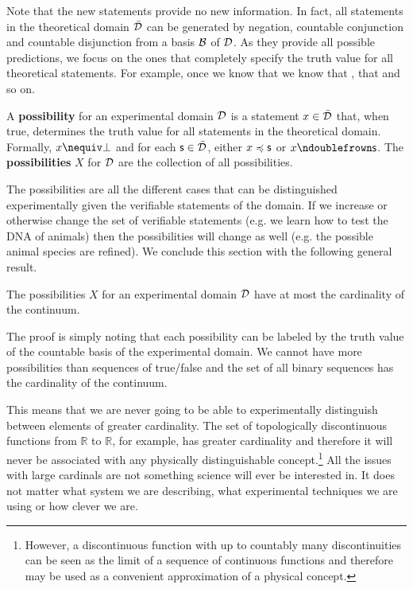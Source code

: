 \documentclass[letterpaper]{article}
\begin{document}
Note that the new statements provide no new information. In fact, all statements in the theoretical domain $\bar{\mathcal{D}}$ can be generated by negation, countable conjunction and countable disjunction from a basis $\mathcal{B}$ of $\mathcal{D}$. As they provide all possible predictions, we focus on the ones that completely specify the truth value for all theoretical statements. For example, once we know that  we know that , that  and so on.

\begin{defn}
	A \textbf{possibility} for an experimental domain $\mathcal{D}$ is a statement $x \in \bar{\mathcal{D}}$ that, when true, determines the truth value for all statements in the theoretical domain. Formally, $x \nequiv \contradiction$ and for each $\mathsf{s} \in \bar{\mathcal{D}}$, either $x \preccurlyeq \mathsf{s}$ or $x \ncomp \mathsf{s}$. The \textbf{possibilities} $X$ for $\mathcal{D}$ are the collection of all possibilities.
\end{defn}

The possibilities are all the different cases that can be distinguished experimentally given the verifiable statements of the domain. If we increase or otherwise change the set of verifiable statements (e.g. we learn how to test the DNA of animals) then the possibilities will change as well (e.g. the possible animal species are refined). We conclude this section with the following general result.

\begin{thrm}
	The possibilities $X$ for an experimental domain $\mathcal{D}$ have at most the cardinality of the continuum.
\end{thrm}

The proof is simply noting that each possibility can be labeled by the truth value of the countable basis of the experimental domain. We cannot have more possibilities than sequences of true/false and the set of all binary sequences has the cardinality of the continuum.

This means that we are never going to be able to experimentally distinguish between elements of greater cardinality. The set of topologically discontinuous functions from $\mathbb{R}$ to $\mathbb{R}$, for example, has greater cardinality and therefore it will never be associated with any physically distinguishable concept.\footnote{However, a discontinuous function with up to countably many discontinuities can be seen as the limit of a sequence of continuous functions and therefore may be used as a convenient approximation of a physical concept.} All the issues with large cardinals are not something science will ever be interested in. It does not matter what system we are describing, what experimental techniques we are using or how clever we are.
\end{document}
